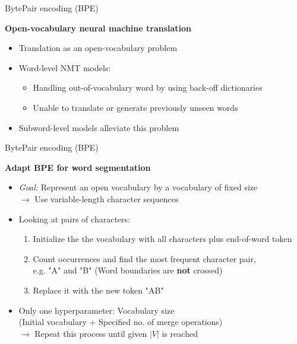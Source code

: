 \begin{vbframe}{BytePair encoding (BPE)}

\vfill

\textbf{Open-vocabulary neural machine translation \href{https://www.aclweb.org/anthology/P16-1162.pdf}{}}
	
	\begin{itemize}
		\item Translation as an open-vocabulary problem
		\item Word-level NMT models:
			\begin{itemize}
				\item Handling out-of-vocabulary word by using back-off dictionaries
				\item Unable to translate or generate previously unseen words
			\end{itemize}
		\item Subword-level models alleviate this problem
	\end{itemize}

\vfill

\end{vbframe}


\begin{vbframe}{BytePair encoding (BPE)}

\vfill

\textbf{Adapt BPE for word segmentation \href{https://www.aclweb.org/anthology/P16-1162.pdf}{}}

	\begin{itemize}
		\item \textit{Goal:} Represent an open vocabulary by a vocabulary of fixed size\\
					$\rightarrow$ Use variable-length character sequences 
		\item Looking at pairs of characters:
			\begin{enumerate}
				\item Initialize the the vocabulary with all characters plus end-of-word token
				\item Count occurrences and find the most frequent character pair,\\
							e.g. "A" and "B" (\warning Word boundaries are \textbf{not} crossed)
				\item Replace it with the new token "AB"
			\end{enumerate}
		\item Only one hyperparameter: Vocabulary size\\
					(Initial vocabulary + Specified no. of merge operations)\\
					$\rightarrow$ Repeat this process until given $|V|$ is reached
	\end{itemize}

\vfill

\end{vbframe}

